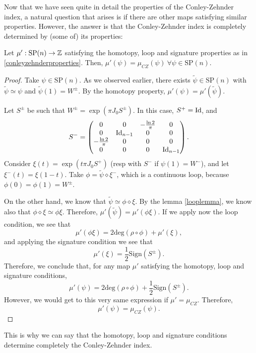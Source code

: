 Now that we have seen quite in detail the properties of the Conley-Zehnder index, a natural question that arises is if there are other maps satisfying similar properties. However, the answer is that the Conley-Zehnder index is completely determined by (some of) its properties:

\begin{theo} Let $\mu' : \text{SP}(n) \rightarrow \mathbb{Z}$ satisfying the homotopy, loop and signature properties as in \ref{conleyzehnderproperties}. Then, $\mu'(\psi) = \mu_{CZ}(\psi) \ \forall \psi \in \text{SP}(n)$.
\end{theo}

\begin{proof}
Take $\psi \in \text{SP}(n)$. As we observed earlier, there exists $\widetilde{\psi} \in \text{SP}(n)$ with $\widetilde{\psi} \simeq \psi$ and $\widetilde{\psi}(1) = W^{\pm}$. By the homotopy property, $\mu'(\psi) = \mu'(\widetilde{\psi})$.

Let $S^{\pm}$ be such that $W^{\pm} = \exp(\pi J_0S^{\pm})$. In this case, $S^+=\text{Id}$, and
\[S^- = \begin{pmatrix} 0 & 0 & -\frac{\ln 2}{\pi} & 0 \\ 0 & \text{Id}_{n-1} & 0 & 0 \\ -\frac{\ln 2}{\pi} & 0 & 0 & 0 \\ 0 & 0 & 0 & \text{Id}_{n-1} \end{pmatrix} .\]
Consider $\xi(t) = \exp(t\pi J_0S^+)$ (resp with $S^-$ if $\psi(1)=W^-$), and let $\xi^-(t) = \xi(1-t)$. Take $\phi = \widetilde{\psi} \diamond \xi^-$, which is a continuous loop, because $\phi(0) = \phi(1) = W^{\pm}$.

On the other hand, we know that $\widetilde{\psi} \simeq \phi \diamond \xi$. By the lemma \ref{looplemma}, we know also that $\phi \diamond \xi \simeq \phi\xi$. Therefore, $\mu'(\widetilde{\psi}) = \mu'(\phi\xi)$. If we apply now the loop condition, we see that
\[\mu'(\phi\xi) = 2\text{deg}(\rho \circ \phi) + \mu'(\xi) ,\]
and applying the signature condition we see that
\[\mu'(\xi) = \frac12 \text{Sign}(S^{\pm}) .\]
Therefore, we conclude that, for any map $\mu'$ satisfying the homotopy, loop and signature conditions,
\[\mu'(\psi) = 2\text{deg}(\rho \circ \phi) + \frac12 \text{Sign}(S^{\pm}).\]
However, we would get to this very same expression if $\mu'=\mu_{CZ}$. Therefore,
\[\mu'(\psi) = \mu_{CZ}(\psi) .\]
\end{proof}

This is why we can say that the homotopy, loop and signature conditions determine completely the Conley-Zehnder index.
